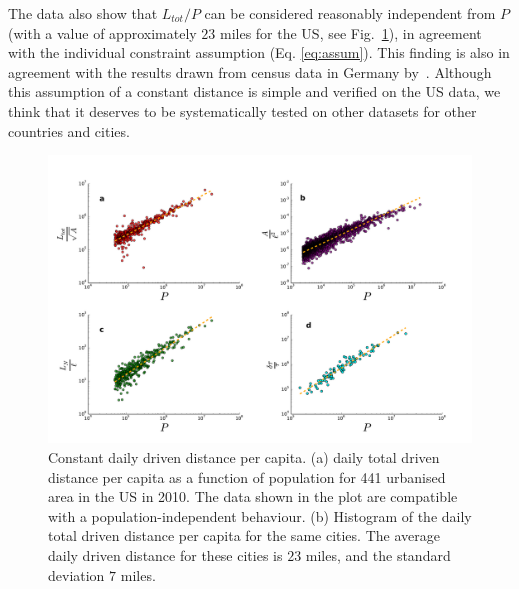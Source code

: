 The data also show that $L_{tot}/P$ can be considered reasonably independent from $P$ (with a value of approximately $23$ miles for the US, see Fig.~\ref{fig:LtotoverP}), in agreement with the individual constraint assumption (Eq. \ref{eq:assum}). This finding is also in agreement with the results drawn from census data in Germany by~\cite{Wilkerson:2013}. Although this assumption of a constant distance is simple and verified on the US data, we think that it deserves to be systematically tested on other datasets for other countries and cities. 
%
\begin{figure}
\includegraphics[width=1.0\textwidth]{gfx/chapter-scaling/figure_1.pdf}
\caption{Constant daily driven distance per capita. (a) daily total driven distance per capita as a function of population for 441 urbanised area in the US in 2010. The data shown in the plot are compatible with a population-independent behaviour. (b) Histogram of the daily total driven distance per capita for the same cities. The average daily driven distance for these cities is $23$ miles, and the standard deviation $7$ miles.}
\label{fig:LtotoverP}
\end{figure}


